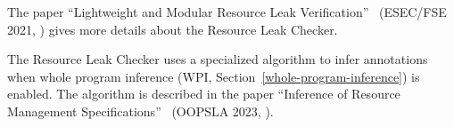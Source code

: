 
The paper ``Lightweight and Modular Resource Leak
Verification''~\cite{KelloggSSE2021} (ESEC/FSE 2021,
)
gives more details about the Resource Leak Checker.

The Resource Leak Checker uses a specialized algorithm to infer annotations
when whole program inference (WPI, Section~\ref{whole-program-inference})
is enabled.  The algorithm is described in the paper ``Inference of
Resource Management Specifications''~\cite{ShadabGTEKLLS2023} (OOPSLA 2023,
).


